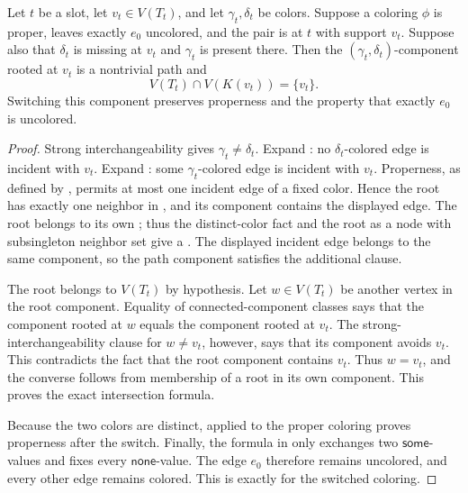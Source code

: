 \begin{helper}
Let \(t\) be a slot, let \(v_t\in V(T_t)\), and let
\(\gamma_t,\delta_t\) be colors. Suppose a coloring \(\phi\) is proper,
leaves exactly \(e_0\) uncolored, and the pair is
 at \(t\) with support \(v_t\). Suppose
also that \(\delta_t\) is missing at \(v_t\) and \(\gamma_t\) is present
there. Then the
\((\gamma_t,\delta_t)\)-component rooted at \(v_t\) is a nontrivial path and
\[
 V(T_t)\cap V(K(v_t))=\{v_t\}.
\]
Switching this component preserves properness and the property that exactly
\(e_0\) is uncolored.
\end{helper}
\begin{proof}
Strong interchangeability gives \(\gamma_t\ne\delta_t\). Expand
: no \(\delta_t\)-colored edge is incident with
\(v_t\). Expand : some
\(\gamma_t\)-colored edge is incident with \(v_t\). Properness, as defined
by , permits at most one incident edge of a
fixed color. Hence the root has exactly one neighbor in
, and its component contains the displayed
edge. The root belongs to its own ; thus the
distinct-color fact and the root as a node with subsingleton neighbor set
give a . The displayed incident edge belongs
to the same component, so the path component satisfies the additional
 clause.

The root belongs to \(V(T_t)\) by hypothesis. Let \(w\in V(T_t)\) be another
vertex in the root component. Equality of connected-component classes says
that the component rooted at \(w\) equals the component rooted at \(v_t\).
The strong-interchangeability clause for \(w\ne v_t\), however, says that
its component avoids \(v_t\). This contradicts the fact that the root
component contains \(v_t\). Thus \(w=v_t\), and the converse follows from
membership of a root in its own component. This proves the exact
intersection formula.

Because the two colors are distinct, 
applied to the proper coloring proves properness after the switch. Finally,
the formula in  only exchanges two
\(\mathsf{some}\)-values and fixes every \(\mathsf{none}\)-value. The edge
\(e_0\) therefore remains uncolored, and every other edge remains colored.
This is exactly  for the switched coloring.
\end{proof}
